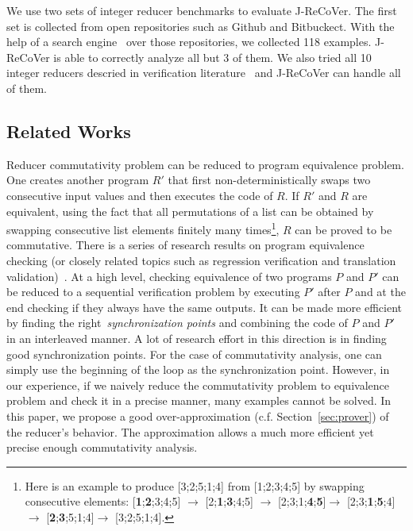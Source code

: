 \documentclass{llncs}
\begin{document}
We use two sets of integer reducer benchmarks to evaluate J-ReCoVer. The first set is collected from open repositories such as Github and Bitbuckect. With the help of a search engine~\cite{searchcode} over those repositories, we collected 118 examples. J-ReCoVer is able to correctly analyze all but 3 of them. We also tried all 10 integer reducers descried in verification literature~\cite{ChenHSW15,ChenSW16} and J-ReCoVer can handle all of them.


\subsection*{Related Works}
Reducer commutativity problem can be reduced to program equivalence problem. One creates another program $R'$ that first non-deterministically swaps two consecutive input values and then executes the code of $R$. If $R'$ and $R$ are equivalent, using the fact that all permutations of a list can be obtained by swapping consecutive list elements finitely many times\footnote{Here is an example to produce [3;2;5;1;4] from [1;2;3;4;5] by swapping consecutive elements: [\textbf{1};\textbf{2};3;4;5] $\rightarrow$ [2;\textbf{1};\textbf{3};4;5] $\rightarrow$ [2;3;1;\textbf{4};\textbf{5}]$\rightarrow$ [2;3;\textbf{1};\textbf{5};4]$\rightarrow$ [\textbf{2};\textbf{3};5;1;4]$\rightarrow$ [3;2;5;1;4].}, $R$ can be proved to be commutative. There is a series of research results on program equivalence checking (or closely related topics such as regression verification and translation validation)~\cite{Pnueli:1998:TV,symdiff,fedyukovich2015automated,sharma2013data,godlin2009regression,fedyukovich2016property,felsing2014automating,KieferKlebanovUlbrich2017,lahiri2013differential,grossman2017verifying,barthe2011relational,KlebanovRuemmerUlbrich2017}. At a high level, checking equivalence of two programs $P$ and $P'$ can be reduced to a sequential verification problem by executing $P'$ after $P$ and at the end checking if they always have the same outputs. It can be made more efficient by finding the right~\emph{synchronization points} and combining the code of $P$ and $P'$ in an interleaved manner. A lot of research effort in this direction is in finding good synchronization points. For the case of commutativity analysis, one can simply use the beginning of the loop as the synchronization point. However, in our experience, if we naively reduce the commutativity problem to equivalence problem and check it in a precise manner, many examples cannot be solved. In this paper, we propose a good over-approximation (c.f. Section~\ref{sec:prover}) of the reducer's behavior. The approximation allows a much more efficient yet precise enough commutativity analysis.
\end{document}
